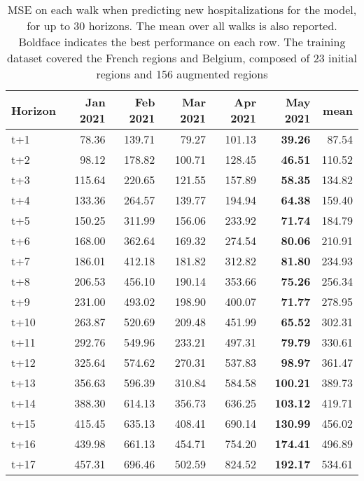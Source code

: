 \begin{table}[H]
\centering
\caption{MSE on each walk when predicting new hospitalizations for the model, for up to 30 horizons. The mean over all walks is also reported. Boldface indicates the best performance on each row. The training dataset covered the French regions and Belgium, composed of 23 initial regions and 156 augmented regions }
\label{tab:MSE_walk_assembly_1}
\begin{tabular}{lrrrrrr}
\toprule
Horizon &  Jan 2021 &  Feb 2021 &  Mar 2021 &  Apr 2021 &  May 2021 &    mean \\
\midrule
t+1  & 78.36  & 139.71  & 79.27  & 101.13  & \textbf{39.26}  & 87.54  \\
t+2  & 98.12  & 178.82  & 100.71  & 128.45  & \textbf{46.51}  & 110.52  \\
t+3  & 115.64  & 220.65  & 121.55  & 157.89  & \textbf{58.35}  & 134.82  \\
t+4  & 133.36  & 264.57  & 139.77  & 194.94  & \textbf{64.38}  & 159.40  \\
t+5  & 150.25  & 311.99  & 156.06  & 233.92  & \textbf{71.74}  & 184.79  \\
t+6  & 168.00  & 362.64  & 169.32  & 274.54  & \textbf{80.06}  & 210.91  \\
t+7  & 186.01  & 412.18  & 181.82  & 312.82  & \textbf{81.80}  & 234.93  \\
t+8  & 206.53  & 456.10  & 190.14  & 353.66  & \textbf{75.26}  & 256.34  \\
t+9  & 231.00  & 493.02  & 198.90  & 400.07  & \textbf{71.77}  & 278.95  \\
t+10  & 263.87  & 520.69  & 209.48  & 451.99  & \textbf{65.52}  & 302.31  \\
t+11  & 292.76  & 549.96  & 233.21  & 497.31  & \textbf{79.79}  & 330.61  \\
t+12  & 325.64  & 574.62  & 270.31  & 537.83  & \textbf{98.97}  & 361.47  \\
t+13  & 356.63  & 596.39  & 310.84  & 584.58  & \textbf{100.21}  & 389.73  \\
t+14  & 388.30  & 614.13  & 356.73  & 636.25  & \textbf{103.12}  & 419.71  \\
t+15  & 415.45  & 635.13  & 408.41  & 690.14  & \textbf{130.99}  & 456.02  \\
t+16  & 439.98  & 661.13  & 454.71  & 754.20  & \textbf{174.41}  & 496.89  \\
t+17  & 457.31  & 696.46  & 502.59  & 824.52  & \textbf{192.17}  & 534.61  \\

\end{tabular}
\end{table}
